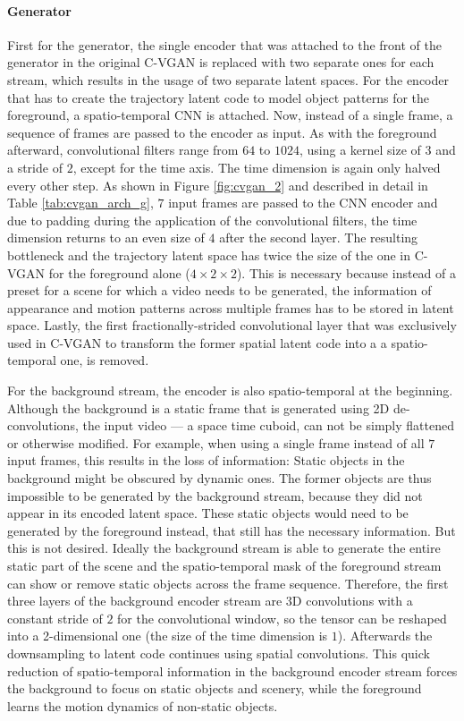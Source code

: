 \paragraph{Generator}
First for the generator, the single encoder that was attached to the front of the generator in the original C-VGAN is replaced with two separate ones for each stream, which results in the usage of two separate latent spaces. For the encoder that has to create the trajectory latent code to model object patterns for the foreground, a spatio-temporal CNN is attached. Now, instead of a single frame, a sequence of frames are passed to the encoder as input. As with the foreground afterward, convolutional filters range from $64$ to $1024$, using a kernel size of $3$ and a stride of $2$, except for the time axis. The time dimension is again only halved every other step. As shown in Figure \ref{fig:cvgan_2} and described in detail in Table \ref{tab:cvgan_arch_g}, $7$ input frames are passed to the CNN encoder and due to padding during the application of the convolutional filters, the time dimension returns to an even size of $4$ after the second layer. The resulting bottleneck and the trajectory latent space has twice the size of the one in C-VGAN for the foreground alone ($4 \times 2 \times 2$). This is necessary because instead of a preset for a scene for which a video needs to be generated, the information of appearance and motion patterns across multiple frames has to be stored in latent space. Lastly, the first fractionally-strided convolutional layer that was exclusively used in C-VGAN to transform the former spatial latent code into a a spatio-temporal one, is removed.

For the background stream, the encoder is also spatio-temporal at the beginning. Although the background is a static frame that is generated using 2D de-convolutions, the input video --- a space time cuboid, can not be simply flattened or otherwise modified. For example, when using a single frame instead of all $7$ input frames, this results in the loss of information: Static objects in the background might be obscured by dynamic ones. The former objects are thus impossible to be generated by the background stream, because they did not appear in its encoded latent space. These static objects would need to be generated by the foreground instead, that still has the necessary information. But this is not desired. Ideally the background stream is able to generate the entire static part of the scene and the spatio-temporal mask of the foreground stream can show or remove static objects across the frame sequence. Therefore, the first three layers of the background encoder stream are 3D convolutions with a constant stride of $2$ for the convolutional window, so the tensor can be reshaped into a 2-dimensional one (the size of the time dimension is $1$). Afterwards the downsampling to latent code continues using spatial convolutions. This quick reduction of spatio-temporal information in the background encoder stream forces the background to focus on static objects and scenery, while the foreground learns the motion dynamics of non-static objects.

